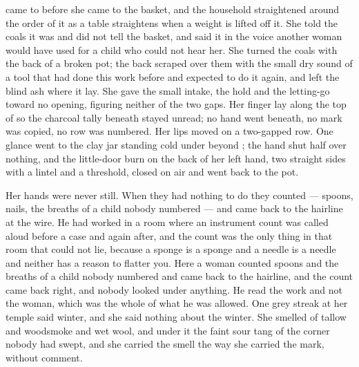 \scenebreak

 came to  before she came to the basket, and the household straightened around the order of it as a table straightens when a weight is lifted off it. She told the coals it was  and did not tell the basket, and said it in the voice another woman would have used for a child who could not hear her. She turned the coals with the back of a broken pot; the back scraped over them with the small dry sound of a tool that had done this work before and expected to do it again, and left the blind ash where it lay. She gave the small intake, the hold and the letting-go toward no opening, figuring neither of the two gaps. Her finger lay along the top of  so the charcoal tally beneath stayed unread; no hand went beneath, no mark was copied, no row was numbered. Her lips moved on a two-gapped row. One glance went to the clay jar standing cold under  beyond ; the hand shut half over nothing, and the little-door burn on the back of her left hand, two straight sides with a lintel and a threshold, closed on air and went back to the pot.

Her hands were never still. When they had nothing to do they counted --- spoons, nails, the breaths of a child nobody numbered --- and came back to the hairline at the wire. He had worked in a room where an instrument count was called aloud before a case and again after, and the count was the only thing in that room that could not lie, because a sponge is a sponge and a needle is a needle and neither has a reason to flatter you. Here a woman counted spoons and the breaths of a child nobody numbered and came back to the hairline, and the count came back right, and nobody looked under anything. He read the work and not the woman, which was the whole of what he was allowed. One grey streak at her temple said winter, and she said nothing about the winter. She smelled of tallow and woodsmoke and wet wool, and under it the faint sour tang of the corner nobody had swept, and she carried the smell the way she carried the mark, without comment.

